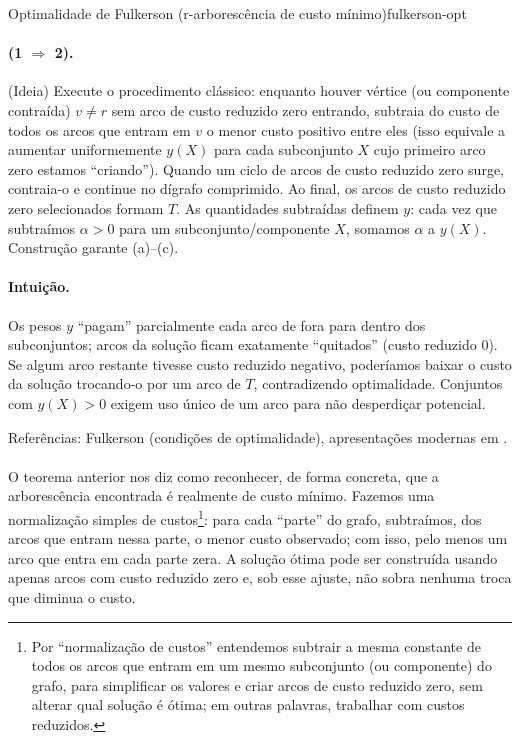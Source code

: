 \documentclass[12pt,a4paper]{article}
\def\emph#1{#1}%
\begin{document}
\begin{teobox}{Optimalidade de Fulkerson (r-arborescência de custo mínimo)}{fulkerson-opt}
\paragraph{(1 $\Rightarrow$ 2).} (Ideia) Execute o procedimento clássico: enquanto houver vértice (ou componente contraída) $v\neq r$ sem arco de custo reduzido zero entrando, subtraia do custo de todos os arcos que entram em $v$ o menor custo positivo entre eles (isso equivale a aumentar uniformemente $y(X)$ para cada subconjunto $X$ cujo primeiro arco zero estamos “criando”). Quando um ciclo de arcos de custo reduzido zero surge, contraia-o e continue no dígrafo comprimido. Ao final, os arcos de custo reduzido zero selecionados formam $T$. As quantidades subtraídas definem $y$: cada vez que subtraímos $\alpha>0$ para um subconjunto/componente $X$, somamos $\alpha$ a $y(X)$. Construção garante (a)–(c).

\paragraph{Intuição.} Os pesos $y$ “pagam” parcialmente cada arco de fora para dentro dos subconjuntos; arcos da solução ficam exatamente “quitados” (custo reduzido 0). Se algum arco restante tivesse custo reduzido negativo, poderíamos baixar o custo da solução trocando-o por um arco de $T$, contradizendo optimalidade. Conjuntos com $y(X)>0$ exigem uso único de um arco para não desperdiçar potencial.

\medskip
\emph{Referências:} Fulkerson (condições de optimalidade), apresentações modernas em \cite{frank2014, schrijver2003comb}.
\label{thm:fulkerson-optimalidade-arborescencia}
\end{teobox}

\paragraph{}
O teorema anterior nos diz como reconhecer, de forma concreta, que a arborescência encontrada é realmente de custo mínimo. Fazemos uma normalização simples de custos\footnote{Por “normalização de custos” entendemos subtrair a mesma constante de todos os arcos que entram em um mesmo subconjunto (ou componente) do grafo, para simplificar os valores e criar arcos de custo reduzido zero, sem alterar qual solução é ótima; em outras palavras, trabalhar com custos reduzidos.}: para cada “parte” do grafo, subtraímos, dos arcos que entram nessa parte, o menor custo observado; com isso, pelo menos um arco que entra em cada parte zera. A solução ótima pode ser construída usando apenas arcos com custo reduzido zero e, sob esse ajuste, não sobra nenhuma troca que diminua o custo.
\end{document}
